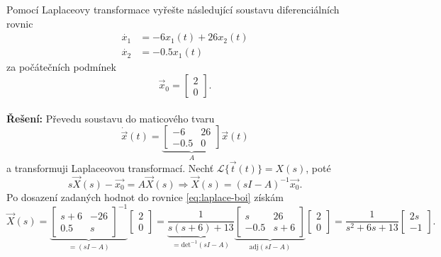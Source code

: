 \documentclass[twoside]{article}
\begin{document}
\subsection{~}
Pomocí Laplaceovy transformace vyřešte následující soustavu diferenciálních rovnic
\begin{equation*}
	\begin{split}
		\dot{x_1} &= - 6x_1 (t) + 26x_2 (t) \\
		\dot{x_2} &= - 0.5 x_1(t)
	\end{split}
\end{equation*}
za počátečních podmínek
\begin{equation*}
	\vec{x}_0 = \begin{bmatrix}
		2 \\
		0
	  \end{bmatrix}.
\end{equation*} \\
\textbf{Řešení:} Převedu soustavu do maticového tvaru
\begin{equation*}
	\dot{\vec{x}}(t) = \underbrace{\begin{bmatrix}
		-6 & 26 \\
		-0.5 & 0
	\end{bmatrix}}_{A} \vec{x}(t)
\end{equation*}
a transformuji Laplaceovou transformací. Nechť $\mathcal{L}\{\vec{t}(t)\} = X(s)$, poté
\begin{equation}
	\label{eq:laplace-boi}
	s\vec{X}(s) - \vec{x_0} = A\vec{X}(s) \Rightarrow \vec{X}(s) = (sI-A)^{-1}\vec{x_0}.
\end{equation}
Po dosazení zadaných hodnot do rovnice \eqref{eq:laplace-boi} získám
\begin{equation*}
	\vec{X}(s) = \underbrace{\begin{bmatrix}
		s + 6 & -26 \\
		0.5 & s
	\end{bmatrix}^{-1}}_{=(sI - A)} \begin{bmatrix}
		2 \\
		0
	\end{bmatrix} = \underbrace{\frac{1}{s(s+6) + 13}}_{=\text{det}^{-1}(sI - A)} \underbrace{\begin{bmatrix}
		s & 26 \\
		-0.5 & s + 6
	\end{bmatrix}}_{\text{adj}(sI - A)} \begin{bmatrix}
		2 \\
		0
	\end{bmatrix} = \frac{1}{s^2 + 6s + 13} \begin{bmatrix}
		2s \\
		-1
	\end{bmatrix}.
\end{equation*}
\end{document}
